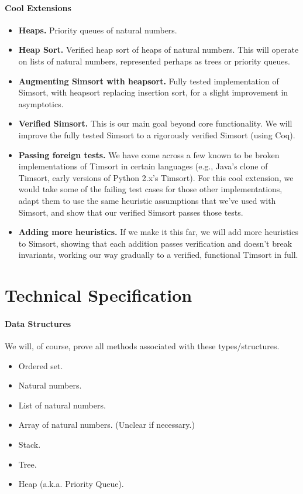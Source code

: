 \documentclass{article}
\begin{document}
\paragraph{Cool Extensions}
\begin{itemize}
  \item \textbf{Heaps.}
    Priority queues of natural numbers.
  \item \textbf{Heap Sort.}
    Verified heap sort of heaps of natural numbers.
    This will operate on lists of natural numbers, represented perhaps
    as trees or priority queues.
  \item \textbf{Augmenting Simsort with heapsort.}
    Fully tested implementation of Simsort, with heapsort replacing
    insertion sort, for a slight improvement in asymptotics.
  \item \textbf{Verified Simsort.}
    This is our main goal beyond core functionality.
    We will improve the fully tested Simsort to
    a rigorously verified Simsort (using Coq).
  \item \textbf{Passing foreign tests.}
    We have come across a few known to be broken implementations of Timsort
    in certain languages (e.g., Java's clone of Timsort,
    early versions of Python 2.x's Timsort).
    For this cool extension, we would take some of the failing test cases for
    those other implementations, adapt them to use the same heuristic
    assumptions that we've used with Simsort, and show that our verified
    Simsort passes those tests.
  \item \textbf{Adding more heuristics.}
    If we make it this far, we will add more heuristics to Simsort,
    showing that each addition passes verification and doesn't break
    invariants, working our way gradually to a verified, functional
    Timsort in full.
\end{itemize}


\section{Technical Specification}
\paragraph{Data Structures}
We will, of course, prove all methods associated with these types/structures.

\begin{itemize}
  \item Ordered set.
  \item Natural numbers.
  \item List of natural numbers.
  \item Array of natural numbers.
    (Unclear if necessary.)
  \item Stack.
  \item Tree.
  \item Heap (a.k.a. Priority Queue).
\end{itemize}
\end{document}
